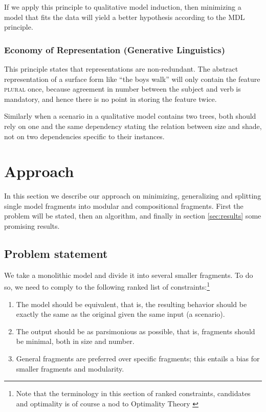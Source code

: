 \documentclass{article} %
\begin{document}
	If we apply this principle to qualitative model induction, then
	minimizing a model that fits the data will yield a better hypothesis
	according to the MDL principle.
  
\subsubsection{Economy of Representation (Generative Linguistics)}

	This principle states that representations are non-redundant. The
	abstract representation of a surface form like ``the boys walk'' will
	only contain the feature \textsc{plural} once, because agreement in
	number between the subject and verb is mandatory, and hence there is
	no point in storing the feature twice. 

	Similarly when a scenario in a qualitative model contains two trees,
	both should rely on one and the same dependency stating the relation
	between size and shade, not on two dependencies specific to their
	instances. 

\section{Approach}
\label{sec:approach}
In this section we describe our approach on minimizing, generalizing and
splitting single model fragments into modular and compositional fragments.
First the problem will be stated, then an algorithm, and finally in section 
\ref{sec:results} some promising results.

\subsection{Problem statement}

We take a monolithic model and divide it into several smaller fragments. To do
so, we need to comply to the following ranked list of
constraints:\footnote{Note that the terminology in this section of ranked
constraints, candidates and optimality is of course a nod to Optimality
Theory \cite{princesmolensky}}

\begin{enumerate}
\item The model should be equivalent, that is, the resulting behavior should
	be exactly the same as the original given the same input (a scenario).

\item The output should be as parsimonious as possible, that is, fragments
	should be minimal, both in size and number.

\item General fragments are preferred over specific fragments; this entails a
	bias for smaller fragments and modularity.

\end{enumerate}
\end{document}
